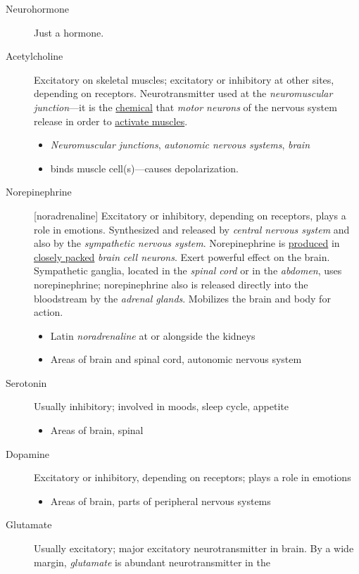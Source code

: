 \documentclass[11pt]{article}
\begin{document}
\begin{description}
\item[{Neurohormone}] Just a hormone.

\item[{Acetylcholine}] Excitatory on skeletal muscles; excitatory or inhibitory
at other sites, depending on receptors. Neurotransmitter used at the
\emph{neuromuscular junction}---it is the \uline{chemical} that \emph{motor neurons} of the
nervous system release in order to \uline{activate muscles}.
\begin{itemize}
\item \emph{Neuromuscular junctions}, \emph{autonomic nervous systems}, \emph{brain}
\item binds muscle cell(s)---causes depolarization.
\end{itemize}
\item[{Norepinephrine}] [noradrenaline] Excitatory or inhibitory, depending on
receptors, plays a role in emotions. Synthesized and released by
\emph{central nervous system} and also by the \emph{sympathetic nervous system}.
Norepinephrine is \uline{produced} in \uline{closely packed} \emph{brain} \emph{cell neurons}. Exert
powerful effect on the brain. Sympathetic ganglia, located in the
\emph{spinal cord} or in the \emph{abdomen}, uses norepinephrine; norepinephrine also
is released directly into the bloodstream by the \emph{adrenal glands}.
Mobilizes the brain and body for action.
\begin{itemize}
\item Latin \emph{noradrenaline} at or alongside the kidneys
\item Areas of brain and spinal cord, autonomic nervous system
\end{itemize}
\item[{Serotonin}] Usually inhibitory; involved in moods, sleep cycle,
appetite
\begin{itemize}
\item Areas of brain, spinal
\end{itemize}
\item[{Dopamine}] Excitatory or inhibitory, depending on receptors; plays a
role in emotions
\begin{itemize}
\item Areas of brain, parts of peripheral nervous systems
\end{itemize}
\item[{Glutamate}] Usually excitatory; major excitatory neurotransmitter in
brain. By a wide margin, \emph{glutamate} is abundant neurotransmitter in the

\end{description}
\end{document}
